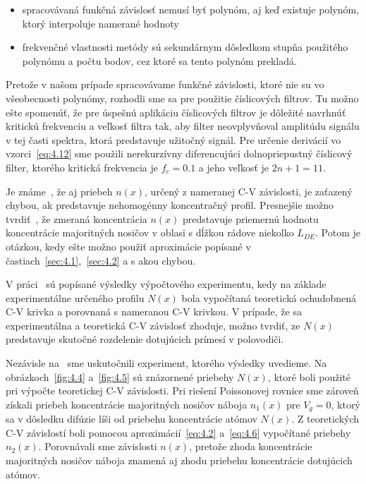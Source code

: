 \begin{itemize}
\item spracovávaná funkčná závislosť nemusí byť polynóm, aj keď
  existuje polynóm, ktorý interpoluje namerané hodnoty
\item frekvenčné vlastnosti metódy sú sekundárnym dôsledkom stupňa
  použitého polynómu a počtu bodov, cez ktoré sa tento polynóm
  prekladá.
\end{itemize}

\par Pretože v našom prípade spracovávame funkčné závislosti, ktoré
nie su vo všeobecnosti polynómy, rozhodli sme sa pre použitie
číslicových filtrov. Tu možno ešte spomenúť, že pre úspešnú aplikáciu
číslicových filtrov je dôležité navrhnúť kritickú frekvenciu a veľkosť
filtra tak, aby filter neovplyvňoval amplitúdu signálu v tej časti
spektra, ktorá predstavuje užitočný signál. Pre určenie derivácií vo
vzorci~\ref{eq:4.12} sme použili nerekurzívny diferencujúci
dolnopriepustný číslicový filter, ktorého kritická frekvencia je
$f_{c}=0.1$ a jeho veľkosť je $2n+1=11$.

\par Je známe~\cite{4.18}, že aj priebeh $n(x)$, určený z nameranej
C-V závislosti, je zaťazený chybou, ak predstavuje nehomogénny
koncentračný profil. Presnejšie možno tvrdiť~\cite{4.3}, že zmeraná
koncentrácia $n(x)$ predstavuje priemernú hodnotu koncentrácie
majoritných nosičov v oblasi s dĺžkou rádove niekolko $L_{DE}$. Potom
je otázkou, kedy ešte možno použiť aproximácie popísané v
častiach~\ref{sec:4.1},~\ref{sec:4.2} a s akou chybou.

\par V práci~\cite{4.22} sú popísané výsledky výpočtového experimentu,
kedy na základe experimentálne určeného profilu $N(x)$ bola vypočítaná
teoretická ochudobnená C-V krivka a porovnaná s nameranou C-V
krivkou. V prípade, že sa experimentálna a teoretická C-V závislosť
zhoduje, možno tvrdiť, ze $N(x)$ predstavuje skutočné rozdelenie
dotujúcich prímesí v polovodiči.

\par Nezávisle na~\cite{4.22} sme uskutočnili experiment, ktorého
výsledky uvedieme. Na obrázkoch~\ref{fig:4.4} a~\ref{fig:4.5} sú
znázornené priebehy $N(x)$, ktoré boli použité pri výpočte teoretickej
C-V závislosti. Pri riešení Poissonovej rovnice sme zároveň získali
priebeh koncentrácie majoritných nosičov náboja $n_{1}(x)$ pre
$V_{g}=0$, ktorý sa v dôsledku difúzie líši od priebehu koncentrácie
atómov $N(x)$. Z teoretických C-V závislostí boli pomocou
aproximácií~\ref{eq:4.2} a~\ref{eq:4.6} vypočítané priebehy
$n_{2}(x)$.  Porovnávali sme závislosti $n(x)$, pretože zhoda
koncentrácie majoritných nosičov náboja znamená aj zhodu priebehu
koncentrácie dotujúcich atómov.

